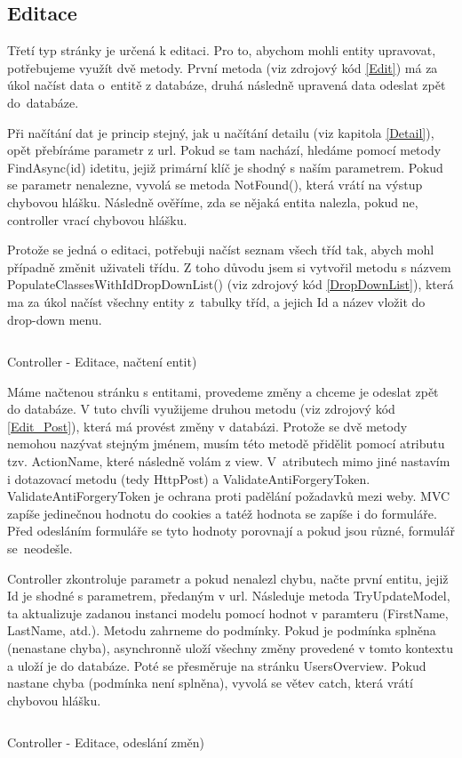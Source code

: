 \documentclass[a4paper, 12pt]{report}
\begin{document}
	\subsection{Editace}
	Třetí typ stránky je určená k editaci. Pro to, abychom mohli entity upravovat, potřebujeme využít dvě metody. První metoda (viz zdrojový kód \ref{Edit}) má za úkol načíst data o~entitě z databáze, druhá následně upravená data odeslat zpět do~databáze.\par
	Při načítání dat je princip stejný, jak u načítání detailu (viz kapitola \ref{Detail}), opět přebíráme parametr z url. Pokud se tam nachází, hledáme pomocí metody FindAsync(id) idetitu, jejiž primární klíč je shodný s naším parametrem. Pokud se parametr nenalezne, vyvolá se metoda NotFound(), která vrátí na výstup chybovou hlášku. Následně ověříme, zda se nějaká entita nalezla, pokud ne, controller vrací chybovou hlášku.\par
	Protože se jedná o editaci, potřebuji načíst seznam všech tříd tak, abych mohl případně změnit uživateli třídu. Z toho důvodu jsem si vytvořil metodu s názvem PopulateClassesWithIdDropDownList() (viz zdrojový kód \ref{DropDownList}), která ma za úkol načíst všechny entity z~tabulky tříd, a jejich Id a název vložit do drop-down menu.
	\begin{listing}[H]
	\inputminted{csharp}{SourceCode/Controllers/Edit.cs}
	\caption{Controller - Editace, načtení entit)}
	\label{Edit}
	\end{listing}
	Máme načtenou stránku s entitami, provedeme změny a chceme je odeslat zpět do databáze. V tuto chvíli využijeme druhou metodu (viz zdrojový kód \ref{Edit_Post}), která má provést změny v databázi. Protože se dvě metody nemohou nazývat stejným jménem, musím této metodě přidělit pomocí atributu tzv. ActionName, které následně volám z view. V~atributech mimo jiné nastavím i dotazovací metodu (tedy HttpPost) a ValidateAntiForgeryToken. ValidateAntiForgeryToken je ochrana proti padělání požadavků mezi weby. MVC zapíše jedinečnou hodnotu do cookies a tatéž hodnota se zapíše i do formuláře. Před odesláním formuláře se tyto hodnoty porovnají a pokud jsou různé, formulář se~neodešle.\par
	Controller zkontroluje parametr a pokud nenalezl chybu, načte první entitu, jejiž Id je shodné s parametrem, předaným v url. Následuje metoda TryUpdateModel, ta aktualizuje zadanou instanci modelu pomocí hodnot v paramteru (FirstName, LastName, atd.). Metodu zahrneme do podmínky. Pokud je podmínka splněna (nenastane chyba), asynchronně uloží všechny změny provedené v tomto kontextu a uloží je do databáze. Poté se přesměruje na stránku UsersOverview. Pokud nastane chyba (podmínka není splněna), vyvolá se větev catch, která vrátí chybovou hlášku.
	\begin{listing}[H]
		\inputminted{csharp}{SourceCode/Controllers/Edit_Post.cs}
		\caption{Controller - Editace, odeslání změn)}
		\label{Edit_Post}
	\end{listing}
\end{document}
